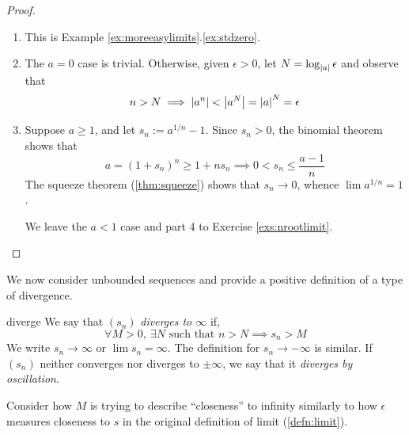 
\begin{proof}
\begin{enumerate}
	\item This is Example \ref*{ex:moreeasylimits}.\ref{ex:stdzero}.
	\item The $a=0$ case is trivial. Otherwise, given $\epsilon>0$, let $N=\log_{\left| a\right|}\epsilon$ and observe that
	\[n>N\implies \left| a^n\right|<\left| a^N\right|=\left| a\right|^N=\epsilon\]
	\item Suppose $a\ge 1$, and let $s_n:=a^{1/n}-1$. Since $s_n>0$, the binomial theorem\footnotemark{} shows that
	\[a=(1+s_n)^n\ge 1+ns_n\implies 0<s_n\le\frac{a-1}n\]
	The squeeze theorem (\ref{thm:squeeze}) shows that $s_n\to 0$, whence $\lim a^{1/n}=1$.\par
	We leave the $a<1$ case and part 4 to Exercise \ref{exs:nrootlimit}. \hfill\qedhere
\end{enumerate}
\end{proof}

\vspace{-10pt}





\goodbreak




We now consider unbounded sequences and provide a positive definition of a type of divergence.

\begin{defn}{}{diverge}
	We say that $(s_n)$ \emph{diverges to $\infty$} if,
	\[\forall M>0,\ \exists N\text{ such that }n>N\implies s_n>M\]
	We write $s_n\to\infty$ or $\lim s_n=\infty$. The definition for $s_n\to-\infty$ is similar.\smallbreak
	If $(s_n)$ neither converges nor diverges to $\pm\infty$, we say that it \emph{diverges by oscillation}.\footnotemark
\end{defn}


Consider how $M$ is trying to describe ``closeness'' to infinity similarly to how $\epsilon$ measures closeness to $s$ in the original definition of limit (\ref{defn:limit}). 

